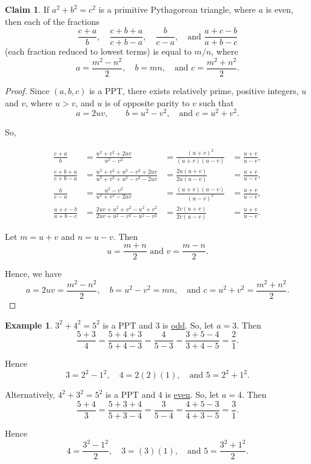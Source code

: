 \documentclass{article}
\theoremstyle{definition}
\newtheorem{claim}{Claim}
\newtheorem{example}{Example}[section]
\begin{document}
\begin{claim}
If \(a^2 + b^2 = c^2\) is a primitive Pythagorean triangle, where \(a\) is even, then each of the fractions \[ \frac{c+a}{b}, \quad \frac{c+b+a}{c+b-a}, \quad
\frac{b}{c-a}, \quad \text{and } \frac{a+c-b}{a+b-c} \] (each fraction reduced to lowest terms) is equal to \(m/n\), where \[ a = \frac{m^2-n^2}{2}, \quad b = mn, \quad \text{and } c = \frac{m^2+n^2}{2}. \]
\end{claim}

\begin{proof}
Since \((a,b,c)\) is a PPT, there exists relatively prime, positive integers, \(u\) and \(v\), where \(u > v\), and \(u\) is of opposite parity to \(v\) such that \[ a = 2uv, \qquad b = u^2 - v^2, \quad\text{and } c = u^2 + v^2. \]

So,

\begin{align*}
\frac{c+a}{b} &= \frac{u^2+v^2+2uv}{u^2-v^2} &= \frac{(u+v)^2}{(u+v)(u-v)} &= \frac{u+v}{u-v}, \\
\frac{c+b+a}{c+b-a} &=  \frac{u^2+v^2+u^2-v^2+2uv}{u^2+v^2+u^2-v^2-2uv} &= \frac{2u(u+v)}{2u(u-v)}&= \frac{u+v}{u-v}, \\
\frac{b}{c-a} &= \frac{u^2-v^2}{u^2+v^2-2uv} &= \frac{(u+v)(u-v)}{(u-v)^2} &= \frac{u+v}{u-v}, \\
\frac{a+c-b}{a+b-c} &=  \frac{2uv+u^2+v^2-u^2+v^2}{2uv+u^2-v^2-u^2-v^2} &= \frac{2v(u+v)}{2v(u-v)}  &= \frac{u+v}{u-v}.
\end{align*}

Let \(m = u + v\) and \(n = u - v\). Then \[u = \frac{m + n}{2} \text{ and } v = \frac{m - n}{2}.\]

Hence, we have \[ a = 2uv = \frac{m^2-n^2}{2}, \quad b = u^2-v^2 = mn, \quad \text{and } c = u^2+v^2 = \frac{m^2+n^2}{2}. \]

\end{proof}

\begin{example}
\( 3^2 + 4^2 = 5^2 \) is a PPT and 3 is \underline{odd}. So, let \(a = 3\). Then \[ \frac{5+3}{4} = \frac{5+4+3}{5+4-3} = \frac{4}{5-3} = \frac{3+5-4}{3+4-5} = \frac{2}{1}.\]

Hence \[ 3=2^2-1^2, \quad 4=2(2)(1), \quad \text{and } 5=2^2+1^2. \]

\noindent Alternatively, \(4^2 + 3^2 = 5^2\) is a PPT and 4 is \underline{even}. So, let \(a = 4\). Then \[ \frac{5+4}{3} = \frac{5+3+4}{5+3-4} = \frac{3}{5-4} = \frac{4+5-3}{4+3-5} = \frac{3}{1}. \]

Hence \[ 4=\frac{3^2-1^2}{2}, \quad 3=(3)(1), \quad \text{and } 5=\frac{3^2+1^2}{2}. \]
\end{example}
\end{document}
